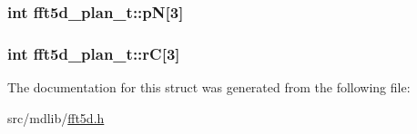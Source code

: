 \hypertarget{structfft5d__plan__t_af4f72880c733b0f42fa7ccb648396b2b}{
\subsubsection[{p\-N}]{\setlength{\rightskip}{0pt plus 5cm}int {\bf fft5d\-\_\-plan\-\_\-t\-::p\-N}\mbox{[}3\mbox{]}}}\label{structfft5d__plan__t_af4f72880c733b0f42fa7ccb648396b2b}
\hypertarget{structfft5d__plan__t_adf429870e2ce99dd8898dcddd557540d}{
\subsubsection[{r\-C}]{\setlength{\rightskip}{0pt plus 5cm}int {\bf fft5d\-\_\-plan\-\_\-t\-::r\-C}\mbox{[}3\mbox{]}}}\label{structfft5d__plan__t_adf429870e2ce99dd8898dcddd557540d}


\-The documentation for this struct was generated from the following file\-:\begin{DoxyCompactItemize}
\item 
src/mdlib/\hyperlink{fft5d_8h}{fft5d.\-h}\end{DoxyCompactItemize}
